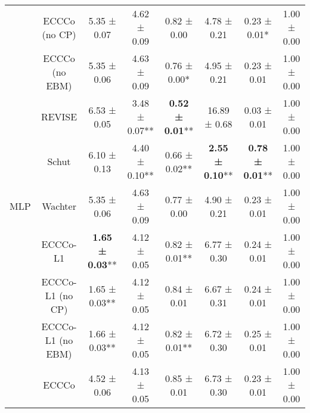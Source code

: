 \begin{table}
{\begin{tabular}[t]{cccccccc}
 & ECCCo (no CP) & 5.35 ± 0.07\hphantom{*}\hphantom{*} & 4.62 ± 0.09\hphantom{*}\hphantom{*} & 0.82 ± 0.00\hphantom{*}\hphantom{*} & 4.78 ± 0.21\hphantom{*}\hphantom{*} & 0.23 ± 0.01*\hphantom{*} & 1.00 ± 0.00\hphantom{*}\hphantom{*}\\

 & ECCCo (no EBM) & 5.35 ± 0.06\hphantom{*}\hphantom{*} & 4.63 ± 0.09\hphantom{*}\hphantom{*} & 0.76 ± 0.00*\hphantom{*} & 4.95 ± 0.21\hphantom{*}\hphantom{*} & 0.23 ± 0.01\hphantom{*}\hphantom{*} & 1.00 ± 0.00\hphantom{*}\hphantom{*}\\

 & REVISE & 6.53 ± 0.05\hphantom{*}\hphantom{*} & 3.48 ± 0.07** & \textbf{0.52 ± 0.01}** & 16.89 ± 0.68\hphantom{*}\hphantom{*} & 0.03 ± 0.01\hphantom{*}\hphantom{*} & 1.00 ± 0.00\hphantom{*}\hphantom{*}\\

 & Schut & 6.10 ± 0.13\hphantom{*}\hphantom{*} & 4.40 ± 0.10** & 0.66 ± 0.02** & \textbf{2.55 ± 0.10}** & \textbf{0.78 ± 0.01}** & 1.00 ± 0.00\hphantom{*}\hphantom{*}\\

\multirow[t]{-10}{*}{\centering\arraybackslash MLP} & Wachter & 5.35 ± 0.06\hphantom{*}\hphantom{*} & 4.63 ± 0.09\hphantom{*}\hphantom{*} & 0.77 ± 0.00\hphantom{*}\hphantom{*} & 4.90 ± 0.21\hphantom{*}\hphantom{*} & 0.23 ± 0.01\hphantom{*}\hphantom{*} & 1.00 ± 0.00\hphantom{*}\hphantom{*}\\
\cmidrule{1-8}
 & ECCCo-L1 & \textbf{1.65 ± 0.03}** & 4.12 ± 0.05\hphantom{*}\hphantom{*} & 0.82 ± 0.01** & 6.77 ± 0.30\hphantom{*}\hphantom{*} & 0.24 ± 0.01\hphantom{*}\hphantom{*} & 1.00 ± 0.00\hphantom{*}\hphantom{*}\\

 & ECCCo-L1 (no CP) & 1.65 ± 0.03** & 4.12 ± 0.05\hphantom{*}\hphantom{*} & 0.84 ± 0.01\hphantom{*}\hphantom{*} & 6.67 ± 0.31\hphantom{*}\hphantom{*} & 0.24 ± 0.01\hphantom{*}\hphantom{*} & 1.00 ± 0.00\hphantom{*}\hphantom{*}\\

 & ECCCo-L1 (no EBM) & 1.66 ± 0.03** & 4.12 ± 0.05\hphantom{*}\hphantom{*} & 0.82 ± 0.01** & 6.72 ± 0.30\hphantom{*}\hphantom{*} & 0.25 ± 0.01\hphantom{*}\hphantom{*} & 1.00 ± 0.00\hphantom{*}\hphantom{*}\\

 & ECCCo & 4.52 ± 0.06\hphantom{*}\hphantom{*} & 4.13 ± 0.05\hphantom{*}\hphantom{*} & 0.85 ± 0.01\hphantom{*}\hphantom{*} & 6.73 ± 0.30\hphantom{*}\hphantom{*} & 0.23 ± 0.01\hphantom{*}\hphantom{*} & 1.00 ± 0.00\hphantom{*}\hphantom{*}\\


\end{tabular}}
\end{table}
